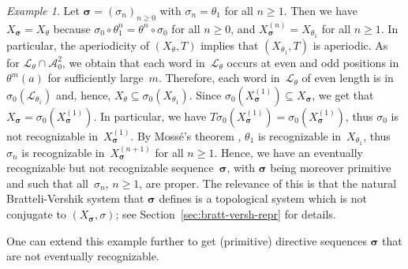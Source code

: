 \documentclass{amsart}
\theoremstyle{definition}
\theoremstyle{remark}
\newtheorem{example}[lemma]{Example}
\numberwithin{equation}{section}
\begin{document}
\begin{example}
Let $\boldsymbol{\sigma} = (\sigma_n)_{n\ge0}$ with $\sigma_n = \theta_1$ for all $n\geq 1$. 
Then we have $X_{\boldsymbol{\sigma}} = X_\theta$ because $\sigma_0 \circ \theta_1^n = \theta^n \circ \sigma_0$ for all $n \ge 0$, and $X_{\boldsymbol{\sigma}}^{(n)} = X_{\theta_1}$ for all $n \ge 1$. 
In particular, the aperiodicity of $(X_\theta,T)$ implies that $(X_{\theta_1},T)$ is aperiodic.
As for $\mathcal{L}_\theta \cap \mathcal{A}_0^2$, we obtain that each word in~$\mathcal{L}_\theta$ occurs at even and odd positions in $\theta^m(a)$ for sufficiently large~$m$.
Therefore, each word in~$\mathcal{L}_\theta$ of even length is in $\sigma_0(\mathcal{L}_{\theta_1})$ and, hence, $X_\theta \subseteq \sigma_0(X_{\theta_1})$.
Since $\sigma_0(X_{\boldsymbol{\sigma}}^{(1)}) \subseteq X_{\boldsymbol{\sigma}}$, we get that $X_{\boldsymbol{\sigma}} = \sigma_0(X_{\boldsymbol{\sigma}}^{(1)})$. 
In particular, we have $T \sigma_0(X_{\boldsymbol{\sigma}}^{(1)}) = \sigma_0(X_{\boldsymbol{\sigma}}^{(1)})$, thus $\sigma_0$ is not recognizable in~$X_{\boldsymbol{\sigma}}^{(1)}$.
By Moss\'{e}'s theorem \cite{Mosse:96}, $\theta_1$ is recognizable in~$X_{\theta_1}$, thus $\sigma_n$ is recognizable in~$X_{\boldsymbol{\sigma}}^{(n+1)}$ for all $n \ge 1$. 
Hence, we have an eventually recognizable but not recognizable sequence~$\boldsymbol{\sigma}$, with $\boldsymbol{\sigma}$ being moreover primitive and such that all~$\sigma_n$, $n\ge 1$, are proper. The relevance of this is that the natural Bratteli-Vershik system that $\boldsymbol{\sigma}$ defines is a topological system which is not conjugate to $(X_{\boldsymbol{\sigma}}, \sigma)$; see Section~\ref{sec:bratt-versh-repr} for details.

\end{example} 

One can extend this example further to get (primitive) directive sequences $\boldsymbol{\sigma}$ that are not eventually recognizable. 
  
\end{document}

